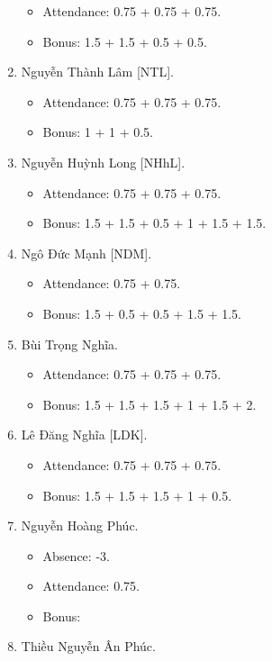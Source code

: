 \documentclass{article}
\begin{document}
\begin{enumerate}
    \begin{itemize}
        \item Attendance: 0.75 + 0.75 + 0.75.
        \item Bonus: 1.5 + 1.5 + 0.5 + 0.5.
    \end{itemize}
    \item {\sc Nguyễn Thành Lâm [NTL].}
    \begin{itemize}
        \item Attendance: 0.75 + 0.75 + 0.75.
        \item Bonus: 1 + 1 + 0.5.
    \end{itemize}
    \item {\sc Nguyễn Huỳnh Long [NHhL].}
    \begin{itemize}
        \item Attendance: 0.75 + 0.75 + 0.75.
        \item Bonus: 1.5 + 1.5 + 0.5 + 1 + 1.5 + 1.5.
    \end{itemize}
    \item {\sc Ngô Đức Mạnh [NDM].}
    \begin{itemize}
        \item Attendance: 0.75 + 0.75.
        \item Bonus: 1.5 + 0.5 + 0.5 + 1.5 + 1.5.
    \end{itemize}
    \item {\sc Bùi Trọng Nghĩa.}
    \begin{itemize}
        \item Attendance: 0.75 + 0.75 + 0.75.
        \item Bonus: 1.5 + 1.5 + 1.5 + 1 + 1.5 + 2.
    \end{itemize}
    \item {\sc Lê Đăng Nghĩa [LDK].}
    \begin{itemize}
        \item Attendance: 0.75 + 0.75 + 0.75.
        \item Bonus: 1.5 + 1.5 + 1.5 + 1 + 0.5.
    \end{itemize}
    \item {\sc Nguyễn Hoàng Phúc.}
    \begin{itemize}
        \item Absence: -3.
        \item Attendance: 0.75.
        \item Bonus:
    \end{itemize}
    \item {\sc Thiều Nguyễn Ân Phúc.}
    \begin{itemize}

\end{itemize}
\end{enumerate}
\end{document}

